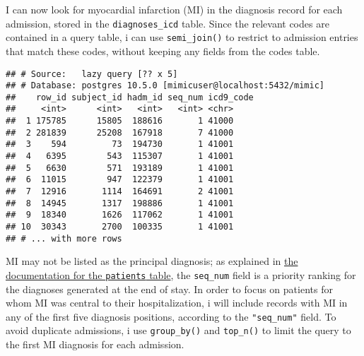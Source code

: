 \documentclass[]{article}
\newenvironment{Shaded}{\begin{snugshade}}{\end{snugshade}}
\newcommand{\KeywordTok}[1]{\textcolor[rgb]{0.13,0.29,0.53}{\textbf{#1}}}
\newcommand{\DataTypeTok}[1]{\textcolor[rgb]{0.13,0.29,0.53}{#1}}
\newcommand{\DecValTok}[1]{\textcolor[rgb]{0.00,0.00,0.81}{#1}}
\newcommand{\StringTok}[1]{\textcolor[rgb]{0.31,0.60,0.02}{#1}}
\newcommand{\OperatorTok}[1]{\textcolor[rgb]{0.81,0.36,0.00}{\textbf{#1}}}
\newcommand{\NormalTok}[1]{#1}
\begin{document}
I can now look for myocardial infarction (MI) in the diagnosis record
for each admission, stored in the \texttt{diagnoses\_icd} table. Since
the relevant codes are contained in a query table, i can use
\texttt{semi\_join()} to restrict to admission entries that match these
codes, without keeping any fields from the codes table.

\begin{Shaded}
\end{Shaded}

\begin{verbatim}
## # Source:   lazy query [?? x 5]
## # Database: postgres 10.5.0 [mimicuser@localhost:5432/mimic]
##    row_id subject_id hadm_id seq_num icd9_code
##     <int>      <int>   <int>   <int> <chr>    
##  1 175785      15805  188616       1 41000    
##  2 281839      25208  167918       7 41000    
##  3    594         73  194730       1 41001    
##  4   6395        543  115307       1 41001    
##  5   6630        571  193189       1 41001    
##  6  11015        947  122379       1 41001    
##  7  12916       1114  164691       2 41001    
##  8  14945       1317  198886       1 41001    
##  9  18340       1626  117062       1 41001    
## 10  30343       2700  100335       1 41001    
## # ... with more rows
\end{verbatim}

MI may not be listed as the principal diagnosis; as explained in
\href{https://mimic.physionet.org/mimictables/diagnoses_icd/}{the
documentation for the \texttt{patients} table}, the \texttt{seq\_num}
field is a priority ranking for the diagnoses generated at the end of
stay. In order to focus on patients for whom MI was central to their
hospitalization, i will include records with MI in any of the first five
diagnosis positions, according to the \texttt{"seq\_num"} field. To
avoid duplicate admissions, i use \texttt{group\_by()} and
\texttt{top\_n()} to limit the query to the first MI diagnosis for each
admission.

\begin{Shaded}
\end{Shaded}
\end{document}
